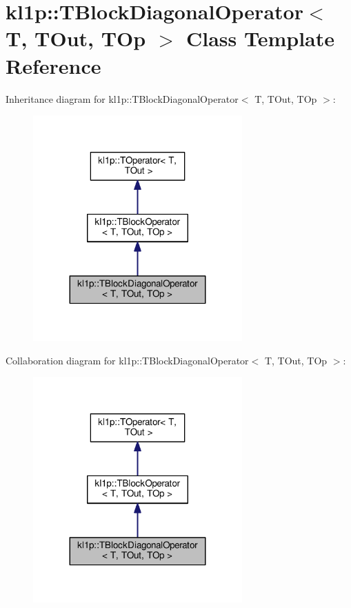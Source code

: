 \hypertarget{classkl1p_1_1TBlockDiagonalOperator}{}\section{kl1p\+:\+:T\+Block\+Diagonal\+Operator$<$ T, T\+Out, T\+Op $>$ Class Template Reference}
\label{classkl1p_1_1TBlockDiagonalOperator}


Inheritance diagram for kl1p\+:\+:T\+Block\+Diagonal\+Operator$<$ T, T\+Out, T\+Op $>$\+:
\nopagebreak
\begin{figure}[H]
\begin{center}
\leavevmode
\includegraphics[width=227pt]{classkl1p_1_1TBlockDiagonalOperator__inherit__graph}
\end{center}
\end{figure}


Collaboration diagram for kl1p\+:\+:T\+Block\+Diagonal\+Operator$<$ T, T\+Out, T\+Op $>$\+:
\nopagebreak
\begin{figure}[H]
\begin{center}
\leavevmode
\includegraphics[width=227pt]{classkl1p_1_1TBlockDiagonalOperator__coll__graph}
\end{center}
\end{figure}
